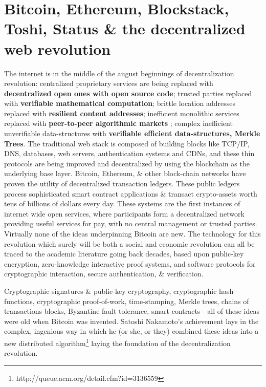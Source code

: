 \documentclass{article}
\begin{document}
\section{Bitcoin, Ethereum, Blockstack, Toshi, Status \& the decentralized web revolution}
 The internet is in the middle of the august beginnings of decentralization revolution: centralized proprietary services are being replaced with \textbf{decentralized open ones with open source code}; trusted parties replaced with \textbf{verifiable mathematical computation}; brittle location addresses replaced with \textbf{resilient content addresses}; inefficient monolithic services replaced with \textbf{peer-to-peer algorithmic markets} ; complex inefficient unverifiable data-structures with \textbf{verifiable efficient data-structures, Merkle Trees}. The traditional web stack is composed of building blocks like TCP/IP, DNS, databases, web servers, authentication systems and CDNs, and these thin protocols are being improved and decentralized by using the blockchain as the underlying base layer. Bitcoin, Ethereum, \& other block-chain networks have proven the utility of decentralized transaction ledgers. These public ledgers process sophisticated smart contract applications \& transact crypto-assets worth tens of billions of dollars every day. These systems are the first instances of internet wide open services, where participants form a decentralized network providing useful services for pay, with no central management or trusted parties. Virtually none of the ideas underpinning Bitcoin are new. The technology for this revolution which surely will be both a social and economic revolution can all be traced to the academic literature going back decades, based upon public-key encryption, zero-knowledge interactive proof systems, and software protocols for cryptographic interaction, secure authentication, \& verification. 

 Cryptographic signatures \& public-key cryptography, cryptographic hash functions, cryptographic proof-of-work, time-stamping, Merkle trees, chains of transactions blocks, Byzantine fault tolerance, smart contracts - all of these ideas were old when Bitcoin was invented.
 Satoshi Nakamoto's achievement lays in the complex, ingenious way in which he (or she, or they) combined these ideas into a new distributed algorithm\footnote{http://queue.acm.org/detail.cfm?id=3136559} laying the foundation of the decentralization revolution.
 

\end{document}
